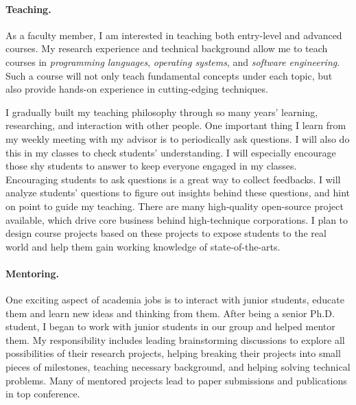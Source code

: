 \documentclass[10pt]{article}
\begin{document}
\vspace{-0.1in}
\paragraph*{Teaching.}
As a faculty member, I am interested in teaching both entry-level and advanced courses. 
My research experience and technical background allow me to teach courses in \textit{programming languages}, \textit{operating systems}, and \textit{software engineering}.
Such a course will not only teach fundamental concepts under each topic, but also provide hands-on experience in cutting-edging techniques.

I gradually built my teaching philosophy through so many years' learning, researching, and interaction with other people. 
One important thing I learn from my weekly meeting with my advisor is to periodically ask questions. 
I will also do this in my classes to check students' understanding. 
I will especially encourage those shy students to answer to keep everyone engaged in my classes. 
Encouraging students to ask questions is a great way to collect feedbacks. 
I will analyze students' questions to figure out insights behind these questions, 
and hint on point to guide my teaching. 
There are many high-quality open-source project available, 
which drive core business behind high-technique corporations. 
I plan to design course projects based on these projects to expose students to the real world 
and help them gain working knowledge of state-of-the-arts. 

\vspace{-0.1in}
\paragraph*{Mentoring.}One exciting aspect of academia jobs is to interact with junior students, 
educate them and learn new ideas and thinking from them. 
After being a senior Ph.D. student, I began to work with junior students in our group and helped mentor them. 
My responsibility includes leading brainstorming discussions to explore all possibilities of their research projects, 
helping breaking their projects into small pieces of milestones, 
teaching necessary background, and helping solving technical problems.
Many of mentored projects lead to paper submissions and publications in top conference. 
\end{document}
